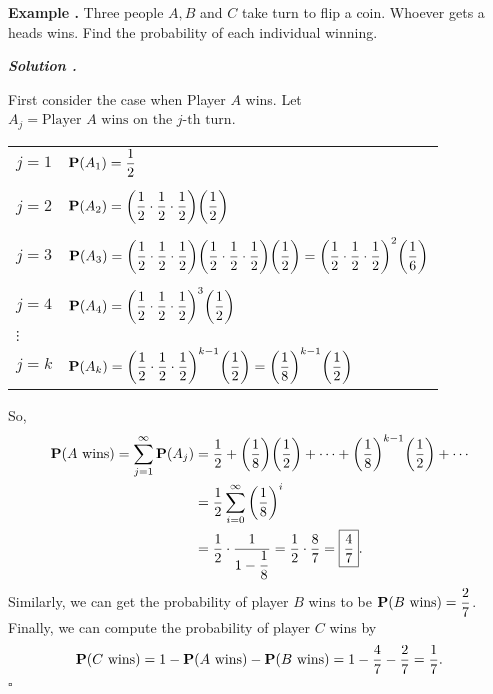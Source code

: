 \documentclass[12pt, a4paper]{article}
\newcounter{index}[subsection]
\newenvironment*{eg}{\begin{framed}\par\noindent\textbf{Example \thesubsection.\stepcounter{index}\theindex}}{\par\end{framed}}
\newcounter{nprf}[subsection]
\newenvironment*{sol}{\par\indent\textbf{\textit{Solution \stepcounter{nprf}\thenprf.}}\par}{\hfill{$\square$}\par}
\def\P{\vb{P}}
\begin{document}
\begin{eg}{}
	Three people $A,B$ and $C$ take turn to flip a coin. Whoever gets a heads wins. Find the probability of each individual winning. 
	\begin{sol}
		First consider the case when Player $A$ wins. Let $A_j=\text{Player }A\text{ wins on the }j\text{-th turn}$. 
		\begin{center}\begin{tabular}{ll}
		$j=1$&$\P(A_1)=\dfrac{1}{2}$\\\\
		$j=2$&$\P(A_2)=\qty(\dfrac{1}{2}\cdot\dfrac{1}{2}\cdot\dfrac{1}{2})\qty(\dfrac{1}{2})$\\\\
		$j=3$&$\P(A_3)=\qty(\dfrac{1}{2}\cdot\dfrac{1}{2}\cdot\dfrac{1}{2})\qty(\dfrac{1}{2}\cdot\dfrac{1}{2}\cdot\dfrac{1}{2})\qty(\dfrac{1}{2})=\qty(\dfrac{1}{2}\cdot\dfrac{1}{2}\cdot\dfrac{1}{2})^2\qty(\dfrac{1}{6})$\\\\
		$j=4$&$\P(A_4)=\qty(\dfrac{1}{2}\cdot\dfrac{1}{2}\cdot\dfrac{1}{2})^3\qty(\dfrac{1}{2})$\\
		$\vdots$&\\
		$j=k$&$\P(A_k)=\qty(\dfrac{1}{2}\cdot\dfrac{1}{2}\cdot\dfrac{1}{2})^{k-1}\qty(\dfrac{1}{2})=\qty(\dfrac{1}{8})^{k-1}\qty(\dfrac{1}{2})$
		\end{tabular}\end{center}	
		So, \[\begin{aligned}\P(A\text{ wins})=\sum_{j=1}^\infty \P(A_j)&=\dfrac{1}{2}+\qty(\dfrac{1}{8})\qty(\dfrac{1}{2})+\cdots+\qty(\dfrac{1}{8})^{k-1}\qty(\dfrac{1}{2})+\cdots\\&=\dfrac{1}{2}\sum_{i=0}^\infty\qty(\dfrac{1}{8})^i\\&=\dfrac{1}{2}\cdot\dfrac{1}{1-\dfrac{1}{8}}=\dfrac{1}{2}\cdot\dfrac{8}{7}=\boxed{\dfrac{4}{7}}.\end{aligned}\]
		Similarly, we can get the probability of player $B$ wins to be $\P(B\text{ wins})=\dfrac{2}{7}$. Finally, we can compute the probability of player $C$ wins by \[\P(C\text{ wins})=1-\P(A\text{ wins})-\P(B\text{ wins})=1-\dfrac{4}{7}-\dfrac{2}{7}=\dfrac{1}{7}.\]
	\end{sol}
\end{eg}
\end{document}

